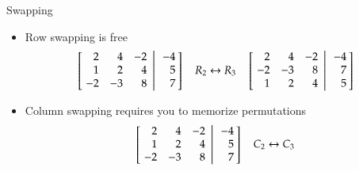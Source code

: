 \documentclass[10pt]{beamer}
\begin{document}
\begin{frame}{Swapping}

\begin{itemize}
    \item Row swapping is free 
\begin{equation*}
    \left[\left.\negthickspace\begin{array}{rrrr}  2 &  4 & -2  \\
                                                    1 &  2 &  4  \\
                                                   -2 & -3 &  8  \end{array}
           \right|\begin{array}{r} -4 \\  5 \\ 7  \end{array}\negthickspace\right]
           \quad R_2\leftrightarrow R_3 \quad 
    \left[\left.\negthickspace\begin{array}{rrrr}  2 &  4 & -2  \\
                                                   -2 & -3 &  8 \\  
                                                    1 &  2 &  4  \\
                                                   \end{array}
           \right|\begin{array}{r} -4 \\  7 \\ 5  \end{array}\negthickspace\right]
\end{equation*}
\item Column swapping requires you to memorize permutations 
\begin{equation*}
    \left[\left.\negthickspace\begin{array}{rrrr}  2 &  4 & -2  \\
                                                    1 &  2 &  4  \\
                                                   -2 & -3 &  8  \end{array}
           \right|\begin{array}{r} -4 \\  5 \\ 7  \end{array}\negthickspace\right]
           \quad \begin{aligned}
               C_2&\leftrightarrow C_3 \\

\end{aligned}
\end{equation*}
\end{itemize}
\end{frame}
\end{document}
